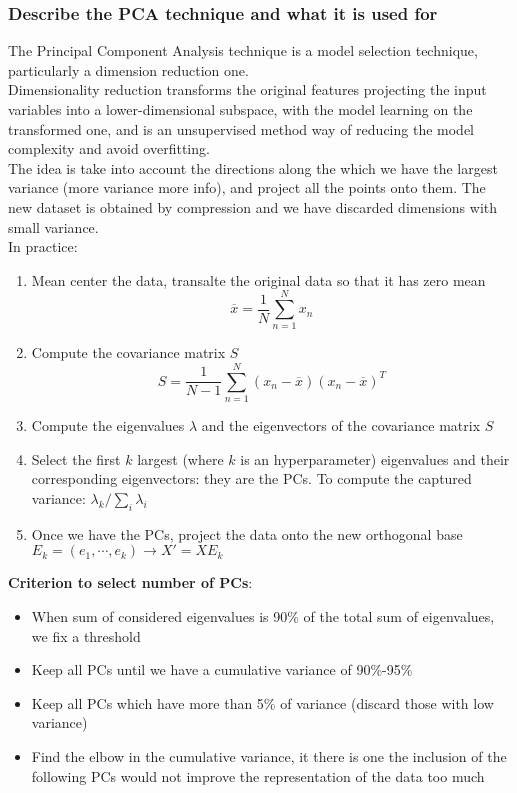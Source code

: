 \subsubsection{Describe the PCA technique and what it is used for}
    The Principal Component Analysis technique is a model selection technique, particularly a dimension reduction one.\\
    Dimensionality reduction transforms the original features projecting the input variables into a lower-dimensional subspace, with the model learning on the transformed one, and is an unsupervised method way of reducing the model complexity and avoid overfitting.\\
    The idea is take into account the directions along the which we have the largest variance (more variance more info), and project all the points onto them. The new dataset is obtained by compression and we have discarded dimensions with small variance.\\
    In practice:
    \begin{enumerate}
        \item Mean center the data, transalte the original data so that it has zero mean
        $$\overline{x}=\frac{1}{N}\sum_{n=1}^Nx_n$$
        \item Compute the covariance matrix $S$
        $$S=\frac{1}{N-1}\sum_{n=1}^N(x_n-\overline{x})(x_n-\overline{x})^T$$
        \item Compute the eigenvalues $\lambda$ and the eigenvectors of the covariance matrix $S$
        \item Select the first $k$ largest (where $k$ is an hyperparameter) eigenvalues and their corresponding eigenvectors: they are the PCs. To compute the captured variance: $\lambda_k/\sum_i\lambda_i$
        \item Once we have the PCs, project the data onto the new orthogonal base $E_k=(e_1,\cdots,e_k)\rightarrow X'=XE_k$
    \end{enumerate}
    \textbf{Criterion to select number of PCs}:
    \begin{itemize}
        \item When sum of considered eigenvalues is 90\% of the total sum of eigenvalues, we fix a threshold
        \item Keep all PCs until we have a cumulative variance of 90\%-95\%
        \item Keep all PCs which have more than 5\% of variance (discard those with low variance)
        \item Find the elbow in the cumulative variance, it there is one the inclusion of the following PCs would not improve the representation of the data too much
    \end{itemize}

